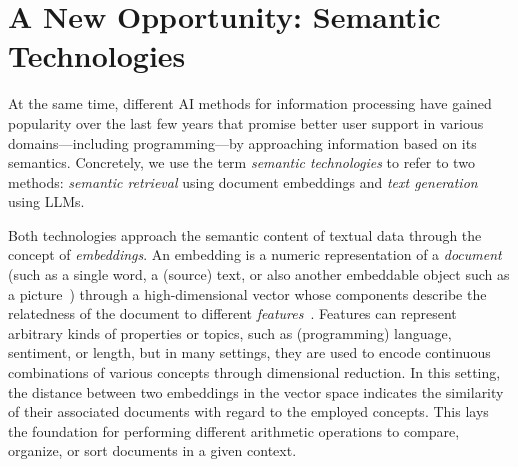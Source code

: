
\section{A New Opportunity: Semantic Technologies}
\label{sec:background/semtec}

At the same time, different AI methods for information processing have gained popularity over the last few years that promise better user support in various domains---including programming---by approaching information based on its semantics.
Concretely, we use the term \emph{semantic technologies} to refer to two methods: \emph{semantic retrieval} using document embeddings and \emph{text generation} using LLMs.

Both technologies approach the semantic content of textual data through the concept of \emph{embeddings}.
An embedding is a numeric representation of a \emph{document} (such as a single word, a (source) text, or also another embeddable object such as a picture~\cite{dosovitskiy2021image}) through a high-dimensional vector whose components describe the relatedness of the document to different \emph{features}~\cite{mikolov2013efficient,devlin2019bert}.
Features can represent arbitrary kinds of properties or topics, such as (programming) language, sentiment, or length, but in many settings, they are used to encode continuous combinations of various concepts through dimensional reduction.
In this setting, the distance between two embeddings in the vector space indicates the similarity of their associated documents with regard to the employed concepts.
This lays the foundation for performing different arithmetic operations to compare, organize, or sort documents in a given context.

